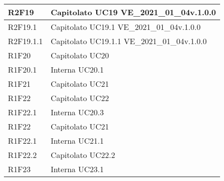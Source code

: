 \begin{center}
\begin{longtable}{|p{22mm}|p{44mm}|}
R2F19 &
Capitolato \newline
UC19 \newline
VE\_2021\_01\_04v.1.0.0 \newline
\\
\hline

R2F19.1 &
Capitolato \newline
UC19.1 \newline
VE\_2021\_01\_04v.1.0.0 \newline
\\
\hline

R2F19.1.1 &
Capitolato \newline
UC19.1.1 \newline
VE\_2021\_01\_04v.1.0.0 \newline
\\
\hline

R1F20 &
Capitolato \newline
UC20 \newline
\\
\hline

R1F20.1 &
Interna \newline
UC20.1 \newline
\\
\hline

R1F21 &
Capitolato \newline
UC21 \newline
\\
\hline

R1F22 &
Capitolato \newline
UC22 \newline
\\
\hline

R1F22.1 &
Interna \newline
UC20.3 \newline
\\
\hline

R1F22 &
Capitolato \newline
UC21 \newline
\\
\hline

R1F22.1 &
Interna \newline
UC21.1 \newline
\\
\hline

R1F22.2 &
Capitolato \newline
UC22.2 \newline
\\
\hline

R1F23 &
Interna \newline
UC23.1 \newline
\\
\hline


\end{longtable}
\end{center}
